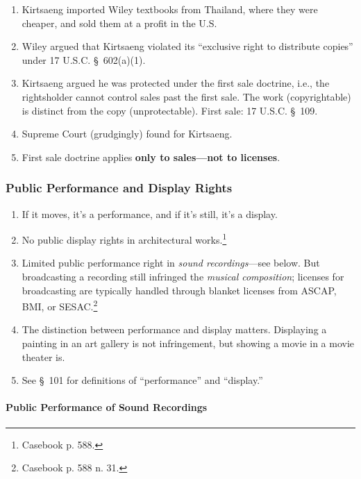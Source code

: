 \begin{enumerate}
    \item Kirtsaeng imported Wiley textbooks from Thailand, where they were 
    cheaper, and sold them at a profit in the U.S.
    \item Wiley argued that Kirtsaeng violated its ``exclusive right to 
    distribute copies'' under 17 U.S.C. \S\ 602(a)(1).
    \item Kirtsaeng argued he was protected under the first sale doctrine, 
    i.e., the rightsholder cannot control sales past the first sale. The work 
    (copyrightable) is distinct from the copy (unprotectable). First sale: 17 
    U.S.C. \S\ 109.
    \item Supreme Court (grudgingly) found for Kirtsaeng.
    \item First sale doctrine applies \textbf{only to sales---not to 
    licenses}.
\end{enumerate}

\subsubsection{Public Performance and Display Rights}

\begin{enumerate}
    \item If it moves, it's a performance, and if it's still, it's a display.
    \item No public display rights in architectural works.\footnote{Casebook 
    p. 588.}
    \item Limited public performance right in \emph{sound recordings}---see 
    below. But broadcasting a recording still infringed the \emph{musical 
    composition}; licenses for broadcasting are typically handled through 
    blanket licenses from ASCAP, BMI, or SESAC.\footnote{Casebook p. 588 n. 
    31.}
    \item The distinction between performance and display matters. Displaying 
    a painting in an art gallery is not infringement, but showing a movie in a 
    movie theater is.
    \item See \S\ 101 for definitions of ``performance'' and ``display.''
\end{enumerate}

\paragraph{Public Performance of Sound Recordings}

